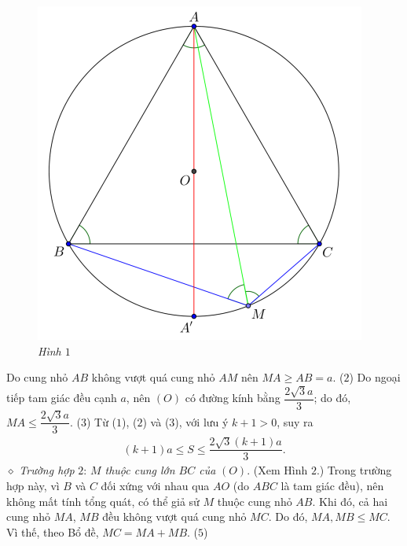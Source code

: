 \begin{multicols}{2}
\begin{figure}[H]
		\vspace*{-5pt}
		\centering
		\captionsetup{labelformat= empty, justification=centering}
		\includegraphics[width= 0.7\linewidth]{P665H1}
		\caption{\small\textit{\color{thachthuctoanhoc}Hình $1$}}
		\vspace*{-10pt}
	\end{figure}
	Do cung nhỏ $AB$ không vượt quá cung nhỏ $AM$ nên $MA \ge AB = a$. \hfill ($2$)
	\vskip 0.05cm
	Do ngoại tiếp tam giác đều cạnh $a$, nên $(O)$ có đường kính bằng $\dfrac{2\sqrt{3}a}{3}$; do đó,  $MA \le \dfrac{2\sqrt{3}a}{3}$.             \hfill ($3$)
	\vskip 0.05cm
	Từ ($1$), ($2$) và ($3$), với lưu ý $k + 1 > 0$, suy ra
	\begin{align*}
		\left( {k + 1} \right)a \le S \le \dfrac{{2\sqrt 3 \left( {k + 1} \right)a}}{3}. \tag{$4$}
	\end{align*}
	$\diamond$ \textit{Trường hợp} $2$: \textit{$M$ thuộc cung lớn $BC$ của} $(O)$. (Xem Hình $2$.)
	\vskip 0.05cm
	Trong trường hợp này, vì $B$ và $C$ đối xứng với nhau qua $AO$ (do $ABC$ là tam giác đều), nên không mất tính tổng quát, có thể giả sử $M$ thuộc cung nhỏ $AB$.
	\vskip 0.05cm
	Khi đó, cả hai cung nhỏ $MA$, $MB$ đều không vượt quá cung nhỏ $MC$. Do đó, $MA, MB \le MC$. Vì thế, theo Bổ đề, $MC = MA + MB.$ \hfill ($5$)
	\begin{figure}[H]
		\vspace*{-5pt}
		\centering
		\captionsetup{labelformat= empty, justification=centering}

\end{figure}
\end{multicols}
